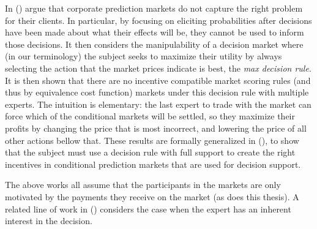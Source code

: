 In (\cite{othman2010decision}) argue that corporate prediction markets do not capture the right problem for their clients. In particular, by focusing on eliciting probabilities after decisions have been made about what their effects will be, they cannot be used to inform those decisions. It then considers the manipulability of a decision market where (in our terminology) the subject seeks to maximize their utility by always selecting the action that the market prices indicate is best, the \emph{max decision rule}. It is then shown that there are no incentive compatible market scoring rules (and thus by equivalence cost function) markets under this decision rule with multiple experts.
The intuition is elementary: the last expert to trade with the market can force which of the conditional markets will be settled, so they maximize their profits by changing the price that is most incorrect, and lowering the price of all other actions bellow that.
These results are formally generalized in (\cite{chen2014eliciting}), to show that the subject must use a decision rule with full support to create the right incentives in conditional prediction markets that are used for decision support.

The above works all assume that the participants in the markets are only motivated by the payments they receive on the market (as does this thesis). A related line of work in (\cite{boutilier2012eliciting}) considers the case when the expert has an inherent interest in the decision. 

